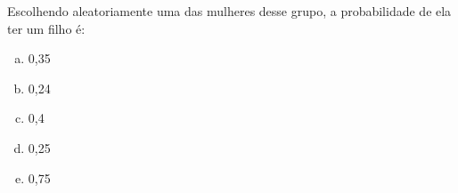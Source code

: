 \documentclass[a4paper,14pt]{article}
\begin{document}
\begin{multicols}{2}
\begin{enumerate}
	    	Escolhendo aleatoriamente uma das mulheres desse grupo, a probabilidade de ela ter um filho é:
	    	\begin{enumerate}[a)]
	    		\item 0,35
	    		\item 0,24
	    		\item 0,4
	    		\item 0,25
	    		\item 0,75
	    	\end{enumerate}
		\end{enumerate}
		$~$ \\ $~$ \\ $~$ \\ $~$ \\ $~$ \\ $~$ \\ $~$ \\ $~$ \\ $~$ \\ $~$ \\ $~$ \\ $~$ \\ $~$ \\ $~$ \\ $~$ \\ $~$ \\ $~$ \\ $~$ \\ $~$ \\ $~$ \\ $~$ \\ $~$ \\ $~$ \\ $~$ \\ $~$ \\ $~$ \\ $~$ \\ $~$ \\ $~$ \\ $~$ \\ $~$ \\ $~$ \\ $~$ \\ $~$ \\ $~$ \\ $~$ \\ $~$ \\ $~$ \\ $~$ \\ $~$ \\ $~$ \\ $~$ \\ $~$ \\ $~$
	\end{multicols}
\end{document}
